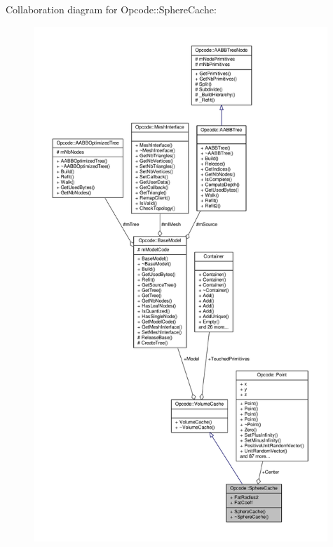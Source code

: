 Collaboration diagram for Opcode\+:\+:Sphere\+Cache\+:
\nopagebreak
\begin{figure}[H]
\begin{center}
\leavevmode
\includegraphics[height=550pt]{d5/d66/structOpcode_1_1SphereCache__coll__graph}
\end{center}
\end{figure}
